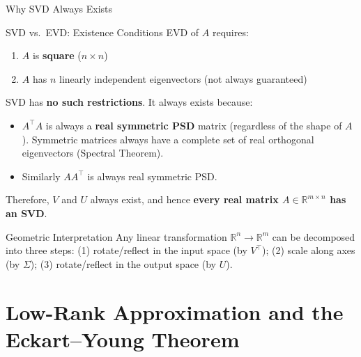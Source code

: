 \documentclass{beamer}
\begin{document}
\begin{frame}[shrink=10]{Why SVD Always Exists}
  \begin{block}{SVD vs.\ EVD: Existence Conditions}
    EVD of $A$ requires:
    \begin{enumerate}\setlength\itemsep{4pt}
      \item $A$ is \textbf{square} ($n \times n$)
      \item $A$ has $n$ linearly independent eigenvectors
            (not always guaranteed)
    \end{enumerate}
    SVD has \textbf{no such restrictions}. It always exists because:
    \begin{itemize}\setlength\itemsep{4pt}
      \item $A^\top A$ is always a \textbf{real symmetric PSD} matrix
            (regardless of the shape of $A$).
            Symmetric matrices always have a complete set of real
            orthogonal eigenvectors (Spectral Theorem).
      \item Similarly $AA^\top$ is always real symmetric PSD.
    \end{itemize}
    Therefore, $V$ and $U$ always exist, and hence \textbf{every real
    matrix $A \in \mathbb{R}^{m \times n}$ has an SVD}.
  \end{block}

  \begin{exampleblock}{Geometric Interpretation}
    Any linear transformation $\mathbb{R}^n \to \mathbb{R}^m$ can be
    decomposed into three steps:
    (1) rotate/reflect in the input space (by $V^\top$);
    (2) scale along axes (by $\Sigma$);
    (3) rotate/reflect in the output space (by $U$).
  \end{exampleblock}
\end{frame}

\section{Low-Rank Approximation and the Eckart--Young Theorem}
\end{document}
